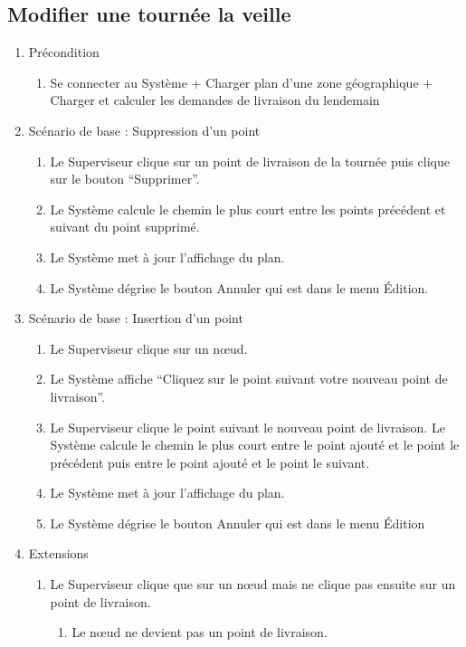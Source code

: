 \subsection{Modifier une tournée la veille}
\begin{enumerate}
\item Précondition
\begin{enumerate}
\item Se connecter au Système + Charger plan d’une zone géographique + Charger et calculer les demandes de livraison du lendemain
\end{enumerate}

\item Scénario de base : Suppression d'un point
\begin{enumerate}
\item Le Superviseur clique sur un point de livraison de la tournée puis clique sur le bouton “Supprimer”.
\item Le Système calcule le chemin le plus court entre les points précédent et suivant du point supprimé.
\item Le Système met à jour l’affichage du plan.
\item Le Système dégrise le bouton Annuler qui est dans le menu Édition.

\end{enumerate}

\item Scénario de base : Insertion d'un point
\begin{enumerate}
\item Le Superviseur clique sur un nœud.
\item Le Système affiche “Cliquez sur le point suivant votre nouveau point de livraison”.
\item Le Superviseur clique le point suivant le nouveau point de livraison.
Le Système calcule le chemin le plus court entre le point ajouté et le point le précédent puis entre le point ajouté et le point le suivant.
\item Le Système met à jour l’affichage du plan.
\item Le Système dégrise le bouton Annuler qui est dans le menu Édition

\end{enumerate}
\item Extensions
\begin{enumerate}
\item Le Superviseur clique que sur un nœud mais ne clique pas ensuite sur un point de livraison.
\begin{enumerate}
\item Le nœud ne devient pas un point de livraison.
\end{enumerate}
\end{enumerate}
\end{enumerate}

